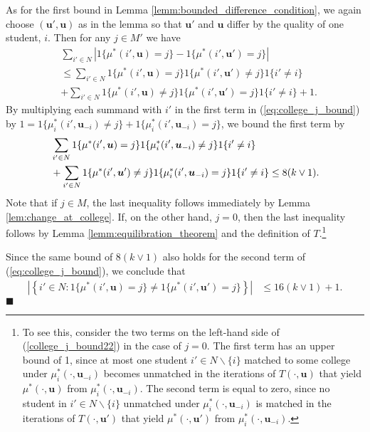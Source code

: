 \documentclass[12pt, fullpage]{amsart}
\theoremstyle{definition}
\theoremstyle{definition}
\theoremstyle{definition}
\begin{document}
\begin{bibunit}[econometrica]
As for the first bound in Lemma \ref{lemm:bounded_difference_condition}, we again choose $(\boldsymbol{u}',\boldsymbol{u})$ as in the lemma so that $\boldsymbol{u}'$ and $\boldsymbol{u}$ differ by the quality of one student, $i$. Then for any $j\in M'$ we have
\begin{align}
	& \sum_{i'\in N} \left|1\{\mu^*(i',\boldsymbol{u})=j\}-1\{\mu^*(i',\boldsymbol{u}')=j\} \right|\nonumber \\
	& \le \sum_{i'\in N}1\{\mu^*(i',\boldsymbol{u})=j\}1\{\mu^*(i',\boldsymbol{u}')\neq j\}1\{i'\neq i\}\label{eq:college_j_bound}\\
	& +\sum_{i'\in N}1\{\mu^*(i',\boldsymbol{u})\neq j\}1\{\mu^*(i',\boldsymbol{u}')=j\}1\{i'\neq i\}+1\nonumber.
\end{align}
By multiplying each summand with $i'$ in the first term in (\ref{eq:college_j_bound})
by $1=1\{\mu_{i}^*(i',\boldsymbol{u}_{-i})\neq j\}+1\{\mu_{i}^*(i',\boldsymbol{u}_{-i})=j\}$, we bound the first term by 
\begin{align}
	\label{college_j_bound22}
	& \sum_{i'\in N}1\{\mu^*(i',\boldsymbol{u})=j\}1\{\mu_{i}^*(i',\boldsymbol{u}_{-i})\neq j\}1\{i'\neq i\}\\ \notag
	& +\sum_{i'\in N}1\{\mu^*(i',\boldsymbol{u}')\neq j\}1\{\mu_{i}^*(i',\boldsymbol{u}_{-i})=j\}1\{i'\neq i\}\leq  8(k\vee 1).
\end{align}
Note that if $j\in M$, the last inequality follows immediately by Lemma \ref{lem:change_at_college}. If, on the other hand,  $j=0$, then the last inequality follows by Lemma \ref{lemm:equilibration_theorem} and the definition of $T$.\footnote{To see this, consider the two terms on the left-hand side of (\ref{college_j_bound22}) in the case of $j=0$. The first term has an upper bound of 1, since at most one student $i'\in N\backslash\{i\}$ matched to some college under $\mu_{i}^{*}(\cdot,\boldsymbol{u}_{-i})$  becomes unmatched in the iterations of  $T(\cdot,\boldsymbol{u})$ that yield $\mu^{*}(\cdot,\boldsymbol{u})$ from $\mu_{i}^{*}(\cdot,\boldsymbol{u}_{-i})$. The second term is equal  to zero, since no student in $i'\in N\backslash\{i\}$  unmatched under $\mu_{i}^{*}(\cdot,\boldsymbol{u}_{-i})$ is matched in the iterations of $T(\cdot,\boldsymbol{u}')$ that yield  $\mu^{*}(\cdot ,\boldsymbol{u}')$ from $\mu_{i}^{*}(\cdot,\boldsymbol{u}_{-i}).$ } 

Since the same bound of $8(k\vee1)$ also holds for the second term of (\ref{eq:college_j_bound}),
we conclude that 
\begin{align*}
	\left|\left\{ i'\in N:1\{\mu^*(i',\boldsymbol{u})=j\}\ne1\{\mu^*(i',\boldsymbol{u}')=j\}\right\} \right| & \leq 16(k\vee1)+1.
\end{align*}
$\blacksquare$ 


\end{bibunit}
\end{document}
